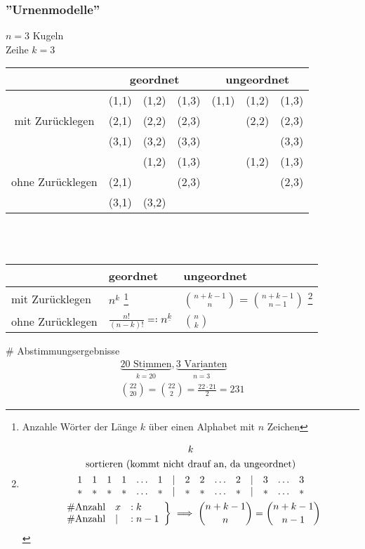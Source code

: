 \subsubsection{''Urnenmodelle''}
\begin{bsp*}
	$n=3$ Kugeln\\
	Zeihe $k=3$ \\
	\begin{tabular}{ c | c c c | c c c }
								&\multicolumn{3}{c|}{geordnet}	&\multicolumn{3}{c}{ungeordnet}		\\	\hline
		\multirow{3}{*}{mit Zurücklegen}	& (1,1)	& (1,2)	& (1,3)	& (1,1)	& (1,2)	& (1,3)		\\
								& (2,1)	& (2,2)	& (2,3)	&		& (2,2)	& (2,3)		\\
								& (3,1)	& (3,2)	& (3,3)	&		&		& (3,3)		\\	\hline
		\multirow{3}{*}{ohne Zurücklegen}	&		& (1,2)	& (1,3)	&		& (1,2)	& (1,3)		\\
								& (2,1)	&		& (2,3)	&		&		& (2,3)		\\
								& (3,1)	& (3,2)	&		&		&		&				
	\end{tabular}\\ \phantom{.} \\
	\begin{tabular}{ l | l | l }
						& geordnet															& ungeordnet							\\	\hline
		mit Zurücklegen		& $n^k$ \footnote{Anzahle Wörter der Länge $k$ über einen Alphabet mit $n$ Zeichen}	& $\binom{n+k-1}{n} = \binom{n+k-1}{n-1}$ \footnote{\begin{gather*}
		\underbrace{1 2 3 1 1 2 1 3 2 3 \dots 3 2}_k \\
		\text{sortieren (kommt nicht drauf an, da ungeordnet)}\\
		\begin{array}{ c c c c c c c c c c c c c c c }
			1	&1	&1	&1	&\dots	&1	&|	&2	&2	&\dots	&2	&|	&3	&\dots	&3	\\
			*	&*	&*	&*	&\dots	&*	&|	&*	&*	&\dots	&*	&|	&*	&\dots	&*	
		\end{array}\\
		\left.\begin{array}{ l l l }
			\# \text{Anzahl}	& x	&: k	\\
			\# \text{Anzahl}	& |	&: n-1
		\end{array} \right\} \implies \binom{n+k-1}{n} = \binom{n+k-1}{n-1}
		\end{gather*}}	\\	\hline
		ohne Zurücklegen	& $\frac{n!}{(n-k)!} \eqqcolon n^{\underline{k}}$								& $\binom{n}{k}$						
	\end{tabular}
\end{bsp*}
\begin{bsp*}{\# Abstimmungsergebnisse}
	\begin{gather*}
		\underbrace{20 \text{ Stimmen}}_{k=20}, \underbrace{3 \text{ Varianten}}_{n=3} \\
		\binom{22}{20} = \binom{22}{2} = \frac{22 \cdot 21}{2} = 231
	\end{gather*}
\end{bsp*}
